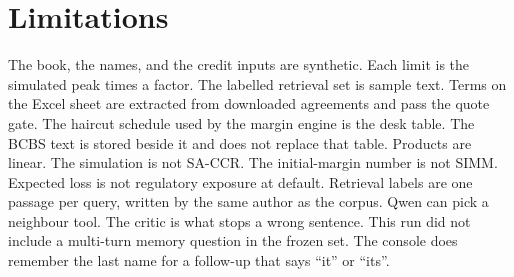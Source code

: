 \documentclass[11pt,a4paper]{article}
\begin{document}
\section{Limitations}

The book, the names, and the credit inputs are synthetic. Each limit is the simulated peak times a factor. The labelled retrieval set is sample text. Terms on the Excel sheet are extracted from downloaded agreements and pass the quote gate. The haircut schedule used by the margin engine is the desk table. The BCBS text is stored beside it and does not replace that table. Products are linear. The simulation is not SA-CCR. The initial-margin number is not SIMM. Expected loss is not regulatory exposure at default. Retrieval labels are one passage per query, written by the same author as the corpus. Qwen can pick a neighbour tool. The critic is what stops a wrong sentence. This run did not include a multi-turn memory question in the frozen set. The console does remember the last name for a follow-up that says ``it'' or ``its''.
\end{document}

